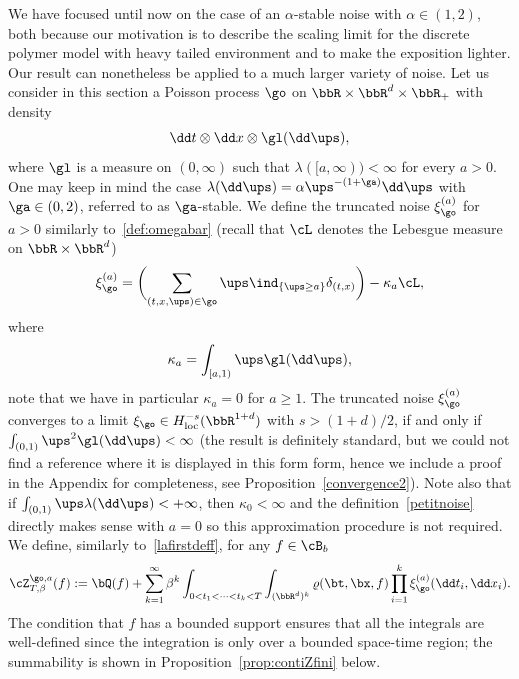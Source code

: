 We have focused until now on the case of an $\alpha$-stable noise with $\alpha\in (1,2)$, both because our motivation is to describe the scaling limit for the discrete polymer model with heavy tailed environment and to make the exposition lighter.
Our result can nonetheless be applied to a much larger variety of noise.
Let us consider in this section a Poisson process $\go$ on $\bbR\times \bbR^d \times \bbR_+$ with density%
\begin{equation}
\label{Poissondensgen}
\dd t \otimes \dd x \otimes \gl(\dd \ups),
\end{equation}
where $\gl$ is a measure on $(0,\infty)$ such that $\lambda([a,\infty))<\infty$ for every $a>0$.
One may keep in mind the case $\lambda(\dd \ups) = \alpha \ups^{-(1+\ga)} \dd \ups$ with $\ga \in (0,2)$, referred to as $\ga$-stable.
We define the truncated noise $\xi^{(a)}_{\go}$ for $a >0 $ similarly to~\eqref{def:omegabar} (recall that $\cL$ denotes the Lebesgue measure on $\bbR\times \bbR^d$)
\begin{equation}\label{petitnoise}
\xi^{(a)}_{\go}= \biggl(\sum_{(t,x,\ups)\in \go} \ups \ind_{\{\ups \geq a\}} \delta_{(t,x)} \biggr)- \kappa_a \cL,
\end{equation}
where
\begin{equation}
\label{def:kappa}
\kappa_a = \int_{[a,1)} \ups \gl(\dd \ups),
\end{equation}
note that we have in particular $\kappa_a=0$ for $a\geq 1$.
The truncated noise $\xi^{(a)}_{\go}$ converges to a limit $\xi_{\go} \in H_\mathrm{loc}^{-s}(\bbR^{1+d})$
with $s>(1+d)/2$, if and only if $\int_{(0,1)} \ups^{2} \gl(\dd \ups)<\infty$ (the result is definitely standard, but we could not find a reference where it is displayed in this form form, hence we include a proof in the Appendix for completeness, see Proposition~\ref{convergence2}).
Note also that if $\int_{(0,1)} \ups \lambda(\dd \ups) <+\infty$, then $\kappa_0<\infty$ and
the definition~\eqref{petitnoise} directly makes sense with $a=0$ so this approximation procedure is not required.
We define, similarly to~\eqref{lafirstdeff}, for any $f\in \cB_b$
\begin{equation}\label{lafirstdeffpti}
\cZ^{\go,a}_{T,\beta}(f):=\bQ(f)+\sum_{k=1}^\infty \beta^k\int_{0<t_1<\dots<t_k<T}\int_{(\bbR^d)^k} \varrho(\bt, \bx, f) \prod_{i=1}^k \xi^{(a)}_{\go} (\dd t_i, \dd x_i).
\end{equation}
The condition that $f$ has a bounded support ensures
that all the integrals are well-defined since the integration is
only over a bounded space-time region; the summability is shown in Proposition~\ref{prop:contiZfini} below.

